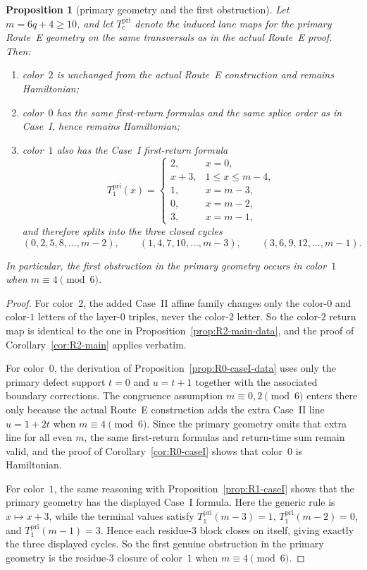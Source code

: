 \documentclass[11pt]{article}
\newtheorem{proposition}{Proposition}
\begin{document}
\begin{proposition}[primary geometry and the first obstruction]\label{prop:primary-geometry-obstruction}
Let $m=6q+4\ge 10$, and let $T_c^{\mathrm{pri}}$ denote the induced lane maps for the primary Route~E geometry on the same transversals as in the actual Route~E proof.
Then:
\begin{enumerate}[label=\textup{(\roman*)},leftmargin=2.5em]
\item color~$2$ is unchanged from the actual Route~E construction and remains Hamiltonian;
\item color~$0$ has the same first-return formulas and the same splice order as in Case~I, hence remains Hamiltonian;
\item color~$1$ also has the Case~I first-return formula
\[
T_1^{\mathrm{pri}}(x)=
\begin{cases}
2,&x=0,\\
x+3,&1\le x\le m-4,\\
1,&x=m-3,\\
0,&x=m-2,\\
3,&x=m-1,
\end{cases}
\]
and therefore splits into the three closed cycles
\[
(0,2,5,8,\dots,m-2),
\qquad
(1,4,7,10,\dots,m-3),
\qquad
(3,6,9,12,\dots,m-1).
\]
\end{enumerate}
In particular, the first obstruction in the primary geometry occurs in color~$1$ when $m\equiv 4\pmod 6$.
\end{proposition}

\begin{proof}
For color~$2$, the added Case~II affine family changes only the color-$0$ and color-$1$ letters of the layer-$0$ triples, never the color-$2$ letter.
So the color-$2$ return map is identical to the one in Proposition~\ref{prop:R2-main-data}, and the proof of Corollary~\ref{cor:R2-main} applies verbatim.

For color~$0$, the derivation of Proposition~\ref{prop:R0-caseI-data} uses only the primary defect support $t=0$ and $u=t+1$ together with the associated boundary corrections.
The congruence assumption $m\equiv 0,2\pmod 6$ enters there only because the actual Route~E construction adds the extra Case~II line $u=1+2t$ when $m\equiv 4\pmod 6$.
Since the primary geometry omits that extra line for all even $m$, the same first-return formulas and return-time sum remain valid, and the proof of Corollary~\ref{cor:R0-caseI} shows that color~$0$ is Hamiltonian.

For color~$1$, the same reasoning with Proposition~\ref{prop:R1-caseI} shows that the primary geometry has the displayed Case~I formula.
Here the generic rule is $x\mapsto x+3$, while the terminal values satisfy $T_1^{\mathrm{pri}}(m-3)=1$, $T_1^{\mathrm{pri}}(m-2)=0$, and $T_1^{\mathrm{pri}}(m-1)=3$.
Hence each residue-$3$ block closes on itself, giving exactly the three displayed cycles.
So the first genuine obstruction in the primary geometry is the residue-$3$ closure of color~$1$ when $m\equiv 4\pmod 6$.
\end{proof}
\end{document}
